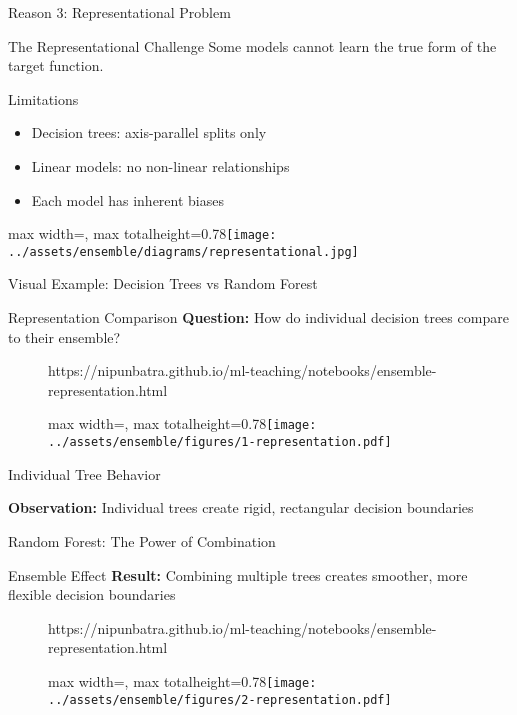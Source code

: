 \documentclass[10pt]{beamer}
\newcommand{\fitpic}[1]{\begin{adjustbox}{max width=\linewidth, max totalheight=0.78\textheight}#1\end{adjustbox}}
\begin{document}
\begin{frame}{Reason 3: Representational Problem}
\begin{definitionbox}{The Representational Challenge}
Some models cannot learn the true form of the target function.
\end{definitionbox}

\begin{examplebox}{Limitations}
\begin{itemize}
\item Decision trees: axis-parallel splits only
\item Linear models: no non-linear relationships
\item Each model has inherent biases
\end{itemize}
\end{examplebox}

\begin{center}
\fitpic{\texttt{[image: ../assets/ensemble/diagrams/representational.jpg]}}
\end{center}
\end{frame}

\begin{frame}{Visual Example: Decision Trees vs Random Forest}
\begin{alertbox}{Representation Comparison}
\textbf{Question:} How do individual decision trees compare to their ensemble?
\end{alertbox}

\begin{figure}[htp]
  \centering
  \begin{notebookbox}{https://nipunbatra.github.io/ml-teaching/notebooks/ensemble-representation.html}
    \fitpic{\texttt{[image: ../assets/ensemble/figures/1-representation.pdf]}}
  \end{notebookbox}
\end{figure}
\end{frame}

\begin{frame}{Individual Tree Behavior}
\begin{keypointsbox}
\textbf{Observation:} Individual trees create rigid, rectangular decision boundaries
\end{keypointsbox}
\end{frame}

\begin{frame}{Random Forest: The Power of Combination}
\begin{examplebox}{Ensemble Effect}
\textbf{Result:} Combining multiple trees creates smoother, more flexible decision boundaries
\end{examplebox}

  \begin{figure}[htp]
    \centering
    \begin{notebookbox}{https://nipunbatra.github.io/ml-teaching/notebooks/ensemble-representation.html}
      \fitpic{\texttt{[image: ../assets/ensemble/figures/2-representation.pdf]}}
    \end{notebookbox}
  \end{figure}
\end{frame}
  
\end{document}
